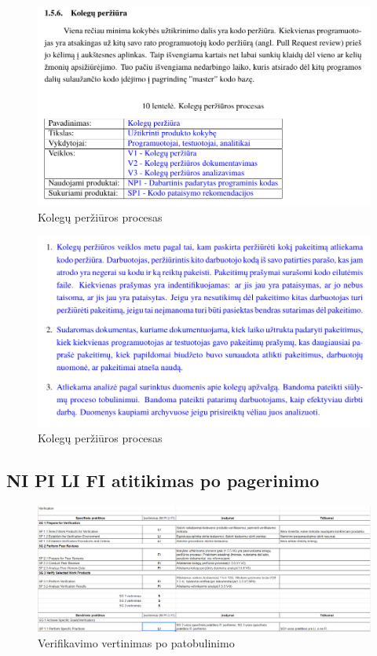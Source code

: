 \documentclass{VUMIFPSkursinis}
\begin{document}
				\begin{figure}[!htbp]
					\includegraphics[scale=0.8]{img/kolegupoone}
					\caption{Kolegų peržiūros procesas} %
					\label{img:ProfilisPo}
				\end{figure}
				\begin{figure}[!htbp]
					\includegraphics[scale=0.8]{img/kolegupotwo}
					\caption{Kolegų peržiūros procesas} %
					\label{img:ProfilisPo}
				\end{figure}

		\subsection{NI PI LI FI atitikimas po pagerinimo}
\pagebreak
				\begin{figure}[!htbp]
					\includegraphics[scale=0.5]{img/verfpo}
					\caption{Verifikavimo vertinimas po patobulinimo} %
					\label{img:ProfilisPo}
				\end{figure}
\end{document}

